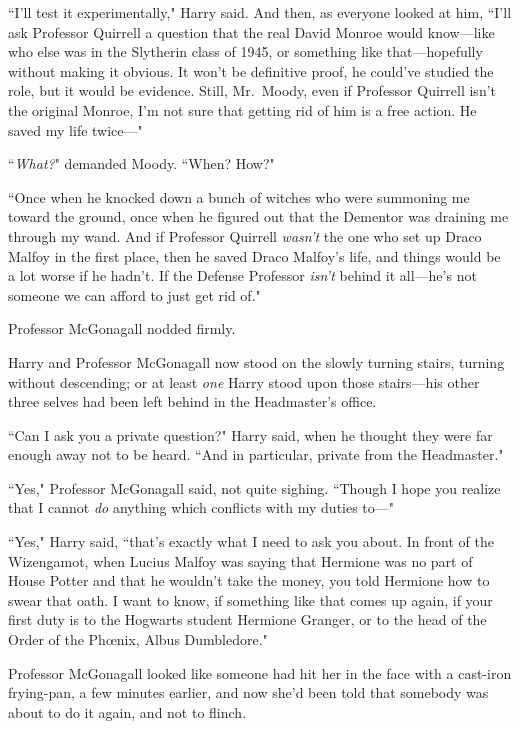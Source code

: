 ``I'll test it experimentally," Harry said. And then, as everyone looked at him, ``I'll ask Professor Quirrell a question that the real David Monroe would know—like who else was in the Slytherin class of 1945, or something like that—hopefully without making it obvious. It won't be definitive proof, he could've studied the role, but it would be evidence. Still, Mr.~Moody, even if Professor Quirrell isn't the original Monroe, I'm not sure that getting rid of him is a free action. He saved my life twice—"

``\emph{What?}" demanded Moody. ``When? How?"

``Once when he knocked down a bunch of witches who were summoning me toward the ground, once when he figured out that the Dementor was draining me through my wand. And if Professor Quirrell \emph{wasn't} the one who set up Draco Malfoy in the first place, then he saved Draco Malfoy's life, and things would be a lot worse if he hadn't. If the Defense Professor \emph{isn't} behind it all—he's not someone we can afford to just get rid of."

Professor McGonagall nodded firmly.


Harry and Professor McGonagall now stood on the slowly turning stairs, turning without descending; or at least \emph{one} Harry stood upon those stairs—his other three selves had been left behind in the Headmaster's office.

``Can I ask you a private question?" Harry said, when he thought they were far enough away not to be heard. ``And in particular, private from the Headmaster."

``Yes," Professor McGonagall said, not quite sighing. ``Though I hope you realize that I cannot \emph{do} anything which conflicts with my duties to—"

``Yes," Harry said, ``that's exactly what I need to ask you about. In front of the Wizengamot, when Lucius Malfoy was saying that Hermione was no part of House Potter and that he wouldn't take the money, you told Hermione how to swear that oath. I want to know, if something like that comes up again, if your first duty is to the Hogwarts student Hermione Granger, or to the head of the Order of the Phœnix, Albus Dumbledore."

Professor McGonagall looked like someone had hit her in the face with a cast-iron frying-pan, a few minutes earlier, and now she'd been told that somebody was about to do it again, and not to flinch.

